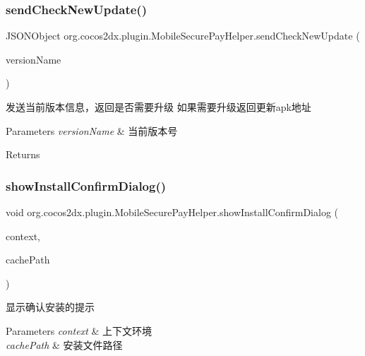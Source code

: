 \subsubsection{\texorpdfstring{send\+Check\+New\+Update()}{sendCheckNewUpdate()}}
{\footnotesize\ttfamily J\+S\+O\+N\+Object org.\+cocos2dx.\+plugin.\+Mobile\+Secure\+Pay\+Helper.\+send\+Check\+New\+Update (\begin{DoxyParamCaption}\item[{String}]{version\+Name }\end{DoxyParamCaption})\hspace{0.3cm}{\ttfamily [inline]}}

发送当前版本信息，返回是否需要升级 如果需要升级返回更新apk地址


\begin{DoxyParams}{Parameters}
{\em version\+Name} & 当前版本号 \\
\hline
\end{DoxyParams}
\begin{DoxyReturn}{Returns}

\end{DoxyReturn}
\mbox{\label{classorg_1_1cocos2dx_1_1plugin_1_1MobileSecurePayHelper_a5b44f735dd270d3988e15469d74955ec}} 
\subsubsection{\texorpdfstring{show\+Install\+Confirm\+Dialog()}{showInstallConfirmDialog()}}
{\footnotesize\ttfamily void org.\+cocos2dx.\+plugin.\+Mobile\+Secure\+Pay\+Helper.\+show\+Install\+Confirm\+Dialog (\begin{DoxyParamCaption}\item[{final Context}]{context,  }\item[{final String}]{cache\+Path }\end{DoxyParamCaption})\hspace{0.3cm}{\ttfamily [inline]}}

显示确认安装的提示


\begin{DoxyParams}{Parameters}
{\em context} & 上下文环境 \\
\hline
{\em cache\+Path} & 安装文件路径 \\
\hline
\end{DoxyParams}


